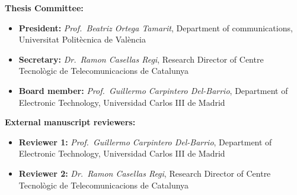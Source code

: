 \textbf{Thesis Committee:}

\begin{itemize}
	\item \textbf{President:} \textit{Prof.~Beatriz Ortega Tamarit}, Department of communications, Universitat Politècnica de València
	\item \textbf{Secretary:} \textit{Dr.~Ramon Casellas Regi}, Research Director of Centre Tecnològic de Telecomunicacions de Catalunya
	\item \textbf{Board member:} \textit{Prof.~Guillermo Carpintero Del-Barrio}, Department of Electronic Technology, Universidad Carlos III de Madrid
\end{itemize}

\textbf{External manuscript reviewers:}
\begin{itemize}
	\item \textbf{Reviewer 1:} \textit{Prof.~Guillermo Carpintero Del-Barrio}, Department of Electronic Technology, Universidad Carlos III de Madrid
	\item \textbf{Reviewer 2:} \textit{Dr.~Ramon Casellas Regi}, Research Director of Centre Tecnològic de Telecomunicacions de Catalunya
\end{itemize}
\newpage
